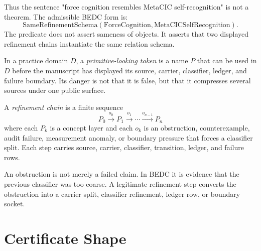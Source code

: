 Thus the sentence "force cognition resembles MetaCIC self-recognition" is not a theorem. The admissible BEDC form is:
$$
\mathrm{SameRefinementSchema}(\mathrm{ForceCognition},\mathrm{MetaCICSelfRecognition}).
$$
The predicate does not assert sameness of objects. It asserts that two displayed refinement chains instantiate the same relation schema.

\begin{definition}
\label{def:layered-relation-primitive-token}
In a practice domain $D$, a \emph{primitive-looking token} is a name $P$ that can be used in $D$ before the manuscript has displayed its source, carrier, classifier, ledger, and failure boundary. Its danger is not that it is false, but that it compresses several sources under one public surface.
\end{definition}

\begin{definition}
\label{def:layered-relation-refinement-chain}
A \emph{refinement chain} is a finite sequence
$$
P_0 \xrightarrow{o_0} P_1 \xrightarrow{o_1} \cdots \xrightarrow{o_{n-1}} P_n
$$
where each $P_k$ is a concept layer and each $o_k$ is an obstruction, counterexample, audit failure, measurement anomaly, or boundary pressure that forces a classifier split. Each step carries source, carrier, classifier, transition, ledger, and failure rows.
\end{definition}

\begin{principle}
\label{prin:layered-relation-obstruction-classifier-pressure}
An obstruction is not merely a failed claim. In BEDC it is evidence that the previous classifier was too coarse. A legitimate refinement step converts the obstruction into a carrier split, classifier refinement, ledger row, or boundary socket.
\end{principle}

\section{Certificate Shape}
\label{sec:layered-relation-certificate-shape}

